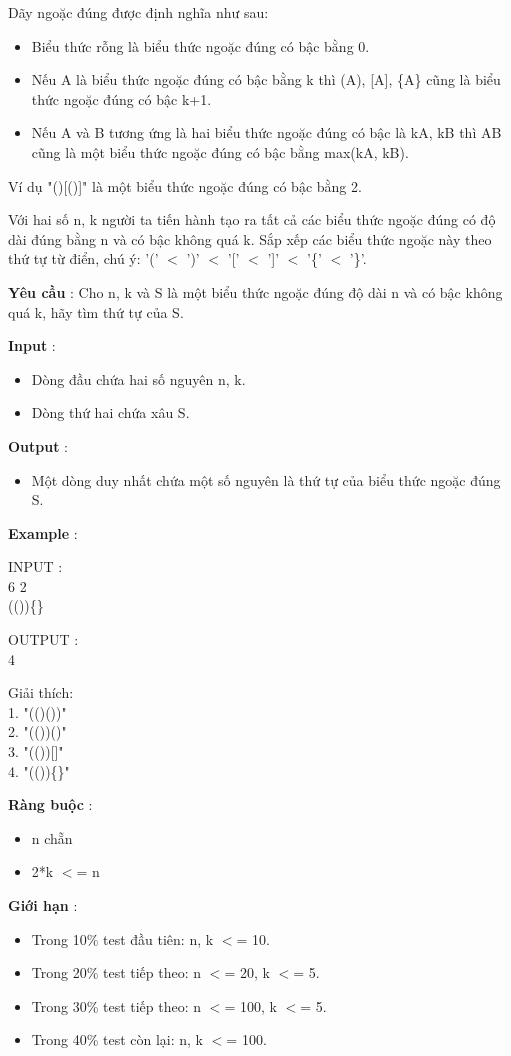 



   Dãy ngoặc đúng được định nghĩa như sau:  
\begin{itemize}
	\item     Biểu thức rỗng là biểu thức ngoặc đúng có bậc bằng 0.   
	\item     Nếu A là biểu thức ngoặc đúng có bậc bằng k thì (A), [A], \{A\} cũng là biểu thức ngoặc đúng có bậc k+1.   
	\item     Nếu A và B tương ứng là hai biểu thức ngoặc đúng có bậc là kA, kB thì AB cũng là một biểu thức ngoặc đúng có bậc bằng max(kA, kB).   
\end{itemize}

   Ví dụ "()[()]" là một biểu thức ngoặc đúng có bậc bằng 2.  

   Với hai số n, k người ta tiến hành tạo ra tất cả các biểu thức ngoặc đúng có độ dài đúng bằng n và có bậc không quá k. Sắp xếp các biểu thức ngoặc này theo thứ tự từ điển, chú ý: '(' $<$ ')' $<$ '[' $<$ ']' $<$ '\{' $<$ '\}'.  

\textbf{      Yêu cầu     }   : Cho n, k và S là một biểu thức ngoặc đúng độ dài n và có bậc không quá k, hãy tìm thứ tự của S.  

\textbf{     Input    }   :  
\begin{itemize}
	\item     Dòng đầu chứa hai số nguyên n, k.   
	\item     Dòng thứ hai chứa xâu S.   
\end{itemize}

\textbf{      Output     }   :  
\begin{itemize}
	\item     Một dòng duy nhất chứa một số nguyên là thứ tự của biểu thức ngoặc đúng S.   
\end{itemize}

\textbf{      Example     }   :  

    INPUT      :   
\\   6 2   
\\   (())\{\}  

    OUTPUT      :   
\\   4  

   Giải thích:   
\\   1. "(()())"   
\\   2. "(())()"   
\\   3. "(())[]"   
\\   4. "(())\{\}"  

\textbf{      Ràng buộc     }   :  
\begin{itemize}
	\item     n chẵn   
	\item     2*k $<$= n   
\end{itemize}

\textbf{      Giới hạn     }   :  
\begin{itemize}
	\item     Trong 10\% test đầu tiên: n, k $<$= 10.   
	\item     Trong 20\% test tiếp theo: n $<$= 20, k $<$= 5.   
	\item     Trong 30\% test tiếp theo: n $<$= 100, k $<$= 5.   
	\item     Trong 40\% test còn lại: n, k $<$= 100.   
\end{itemize}

